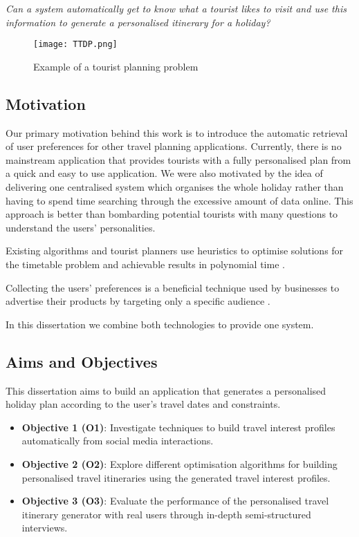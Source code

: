 \begin{center}

    \textit{Can a system automatically get to know
    what a tourist likes to visit and use this
information to generate a personalised itinerary for a
holiday?}

\end{center}


\begin{figure}[h]
\centering
\texttt{[image: TTDP.png]}
\caption{Example of a tourist planning problem}
\label{TTDP}
\end{figure}

\subsection{Motivation}

Our primary motivation behind this work is to
introduce the automatic retrieval of user preferences
for other travel planning applications. Currently,
there is no mainstream application that provides
tourists with a fully personalised plan from a quick
and easy to use application.  We were also motivated
by the idea of delivering one centralised system which
organises the whole holiday rather than having to
spend time searching through the excessive amount of
data online. This approach is better than bombarding
potential tourists with many questions to understand
the users' personalities.

Existing algorithms and tourist planners use
heuristics to optimise solutions for the timetable
problem and achievable results in polynomial time
\cite{Vansteenwegen2011}.

Collecting the users' preferences is a
beneficial technique used by businesses to advertise
their products by targeting only a specific audience
\cite{article}.

In this dissertation we combine both
technologies to provide one system.

\subsection{Aims and Objectives}

This dissertation aims to build an application that
generates a personalised holiday plan according to the
user's travel dates and constraints.


\begin{itemize}
    \item \textbf{Objective 1 (O1)}: Investigate techniques to build travel interest
    profiles automatically from social media interactions.  
    \item \textbf{Objective 2 (O2)}: Explore different optimisation algorithms for
    building personalised travel itineraries using the
    generated travel interest profiles. 
    \item \textbf{Objective 3 (O3)}: Evaluate the
    performance of the personalised travel itinerary
    generator with real users through in-depth
    semi-structured interviews. 

\end{itemize}

